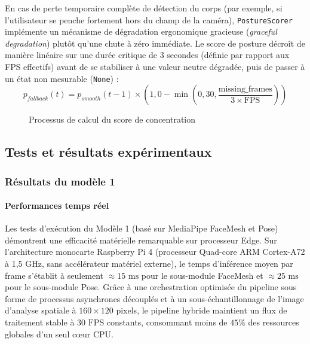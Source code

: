 En cas de perte temporaire complète de détection du corps (par exemple, si l'utilisateur se penche fortement hors du champ de la caméra), \texttt{PostureScorer} implémente un mécanisme de dégradation ergonomique gracieuse (\textit{graceful degradation}) plutôt qu'une chute à zéro immédiate. Le score de posture décroît de manière linéaire sur une durée critique de 3 secondes (définie par rapport aux FPS effectifs) avant de se stabiliser à une valeur neutre dégradée, puis de passer à un état non mesurable (\texttt{None}) :
\begin{equation}
    p_{fallback}(t) = p_{smooth}(t-1) \times \left(1,0 - \min\left(0,30, \frac{\text{missing\_frames}}{3 \times \text{FPS}}\right)\right)
\end{equation}

\begin{figure}[H]
    \centering
    \caption{Processus de calcul du score de concentration}
    \label{fig:score_calculation}
\end{figure}

\subsection{Tests et résultats expérimentaux}

\subsubsection{Résultats du modèle 1}

\paragraph{Performances temps réel}

Les tests d'exécution du Modèle 1 (basé sur MediaPipe FaceMesh et Pose) démontrent une efficacité matérielle remarquable sur processeur Edge. Sur l'architecture monocarte Raspberry Pi 4 (processeur Quad-core ARM Cortex-A72 à 1,5 GHz, sans accélérateur matériel externe), le temps d'inférence moyen par frame s'établit à seulement $\approx 15\text{ ms}$ pour le sous-module FaceMesh et $\approx 25\text{ ms}$ pour le sous-module Pose. Grâce à une orchestration optimisée du pipeline sous forme de processus asynchrones découplés et à un sous-échantillonnage de l'image d'analyse spatiale à $160 \times 120$ pixels, le pipeline hybride maintient un flux de traitement stable à $30\text{ FPS}$ constants, consommant moins de $45\%$ des ressources globales d'un seul cœur CPU.

